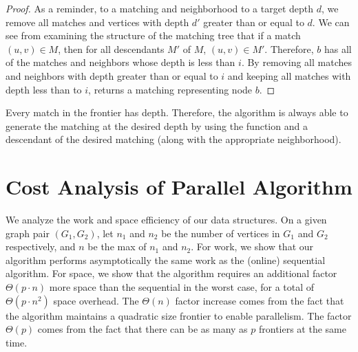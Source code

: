 \begin{proof}
  As a reminder, to  a matching and neighborhood to a target depth
  $d$, we remove all matches and vertices with depth $d'$ greater
  than or equal to $d$.
  We can see from examining the structure of the matching tree that
  if a match $(u, v) \in M$, then for all descendants $M'$ of $M$,
  $(u, v) \in M'$.
  Therefore, $b$ has all of the matches and neighbors whose depth
  is less than $i$.
  By removing all matches and neighbors with depth greater than or equal to $i$
  and keeping all matches with depth less than to $i$,
   returns a matching representing node $b$.
\end{proof}

Every match in the frontier has depth. Therefore, the algorithm is
always able to generate the matching at the desired depth by using the
 function and a descendant of the desired matching (along
with the appropriate neighborhood).
%


%
\section{Cost Analysis of Parallel Algorithm}
We analyze the work and space efficiency of our data structures.
%
On a given graph pair $(G_1, G_2)$, let $n_1$ and $n_2$ be the number of
vertices in $G_1$ and $G_2$ respectively, and $n$ be the max of $n_1$ and $n_2$.
%
For work, we show that our algorithm performs asymptotically the same
work as the (online) sequential algorithm.
%
%
For space, we show that
the algorithm requires an additional factor $\Theta(p\cdot n)$ more space
than the sequential in the worst case, for a total of $\Theta(p\cdot n^2)$ space overhead.
%
The $\Theta(n)$ factor increase
comes from the fact that the algorithm maintains a
quadratic size frontier to enable parallelism.
%
The factor $\Theta(p)$ comes from the fact that there can be as many
as $p$ frontiers at the same time.


